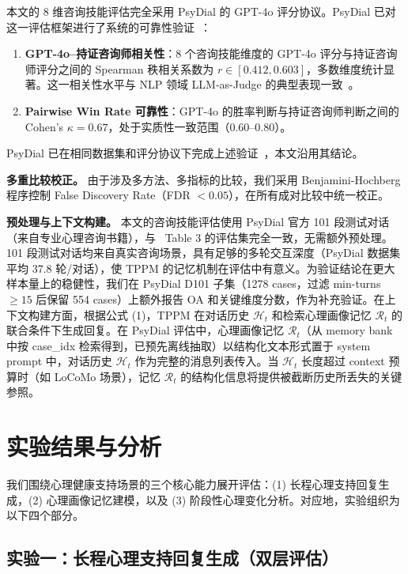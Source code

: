 \documentclass[12pt,a4paper]{article}
\begin{document}
本文的 8 维咨询技能评估完全采用 PsyDial 的 GPT-4o 评分协议。PsyDial 已对这一评估框架进行了系统的可靠性验证~\cite{qiu2025psydial}：

\begin{enumerate}
  \item \textbf{GPT-4o--持证咨询师相关性}：8 个咨询技能维度的 GPT-4o 评分与持证咨询师评分之间的 Spearman 秩相关系数为 $r \in [0.412, 0.603]$，多数维度统计显著。这一相关性水平与 NLP 领域 LLM-as-Judge 的典型表现一致~\cite{zheng2023judging}。
  \item \textbf{Pairwise Win Rate 可靠性}：GPT-4o 的胜率判断与持证咨询师判断之间的 Cohen's $\kappa = 0.67$，处于实质性一致范围（0.60--0.80）。
\end{enumerate}

PsyDial 已在相同数据集和评分协议下完成上述验证~\cite{qiu2025psydial}，本文沿用其结论。

\textbf{多重比较校正。} 由于涉及多方法、多指标的比较，我们采用 Benjamini-Hochberg 程序控制 False Discovery Rate（FDR $< 0.05$），在所有成对比较中统一校正。

\textbf{预处理与上下文构建。} 本文的咨询技能评估使用 PsyDial 官方 101 段测试对话（来自专业心理咨询书籍），与~\cite{qiu2025psydial} Table 3 的评估集完全一致，无需额外预处理。101 段测试对话均来自真实咨询场景，具有足够的多轮交互深度（PsyDial 数据集平均 37.8 轮/对话），使 TPPM 的记忆机制在评估中有意义。为验证结论在更大样本量上的稳健性，我们在 PsyDial D101 子集（1278 cases，过滤 min-turns $\geq 15$ 后保留 554 cases）上额外报告 OA 和关键维度分数，作为补充验证。在上下文构建方面，根据公式 (1)，TPPM 在对话历史 $\mathcal{H}_t$ 和检索心理画像记忆 $\mathcal{R}_t$ 的联合条件下生成回复。在 PsyDial 评估中，心理画像记忆 $\mathcal{R}_t$（从 memory bank 中按 case\_idx 检索得到，已预先离线抽取）以结构化文本形式置于 system prompt 中，对话历史 $\mathcal{H}_t$ 作为完整的消息列表传入。当 $\mathcal{H}_t$ 长度超过 context 预算时（如 LoCoMo 场景），记忆 $\mathcal{R}_t$ 的结构化信息将提供被截断历史所丢失的关键参照。

\section{实验结果与分析}
\label{sec:results}

我们围绕心理健康支持场景的三个核心能力展开评估：(1) 长程心理支持回复生成，(2) 心理画像记忆建模，以及 (3) 阶段性心理变化分析。对应地，实验组织为以下四个部分。

\subsection{实验一：长程心理支持回复生成（双层评估）}
\label{sec:exp1}
\end{document}
